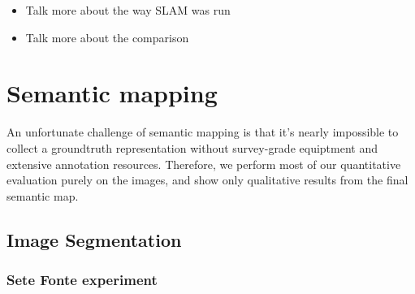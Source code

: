 \begin{itemize}
    \item Talk more about the way SLAM was run
    \item Talk more about the comparison
\end{itemize}


\section{Semantic mapping}
An unfortunate challenge of semantic mapping is that it's nearly impossible to collect a groundtruth representation without survey-grade equiptment and extensive annotation resources. Therefore, we perform most of our quantitative evaluation purely on the images, and show only qualitative results from the final semantic map. 

\subsection{Image Segmentation}



\subsubsection{Sete Fonte experiment}

